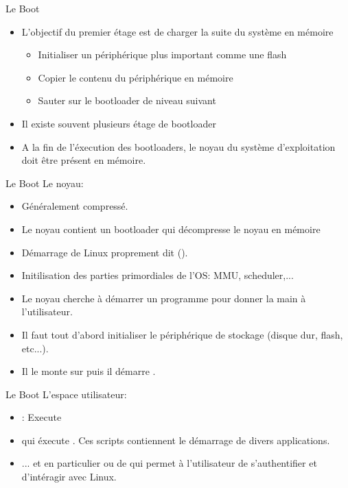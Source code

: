 \begin{frame}[fragile=singleslide]{Le Boot}
  \begin{itemize} 
  \item L'objectif du premier étage est de charger la suite du système
    en mémoire
    \begin{itemize}
    \item Initialiser un périphérique plus important comme une flash
    \item Copier le contenu du périphérique en mémoire
    \item Sauter sur le bootloader de niveau suivant
    \end{itemize}
  \item Il existe souvent plusieurs étage de bootloader
  \item A la  fin de l'éxecution des bootloaders,  le noyau du système
    d'exploitation doit être présent en mémoire.
  \end{itemize}
\end{frame}

\begin{frame}[fragile=singleslide]{Le Boot}
  Le noyau:
  \begin{itemize}
  \item Généralement compressé.
  \item Le  noyau contient un  bootloader qui décompresse le  noyau en
    mémoire
  \item       Démarrage       de       Linux      proprement       dit
    ().
  \item   Initilisation  des  parties   primordiales  de   l'OS:  MMU,
    scheduler,...
  \item Le noyau cherche à démarrer un programme pour donner la main à
    l'utilisateur.
  \item Il  faut tout d'abord initialiser le  périphérique de stockage
    (disque dur, flash, etc...).
  \item Il le monte sur \file{/} puis il démarre .
  \end{itemize}
\end{frame}

\begin{frame}[fragile=singleslide]{Le Boot}
  L'espace utilisateur:
  \begin{itemize}
  \item {}:  Execute 
  \item qui  éxecute .  Ces  scripts contiennent le
    démarrage de divers applications.
  \item  ...  et  en  particulier   ou  de   qui
    permet  à  l'utilisateur  de  s'authentifier et  d'intéragir  avec
    Linux.
  \end{itemize}
\end{frame}

